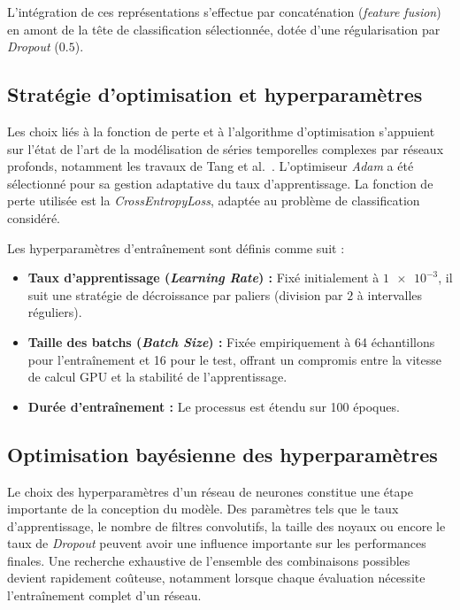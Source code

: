 \documentclass[12pt,a4paper,twoside]{article}
\begin{document}
L'intégration de ces représentations s'effectue par concaténation (\textit{feature fusion}) en amont de la tête de classification sélectionnée, dotée d'une régularisation par \textit{Dropout} ($0.5$).

\subsection{Stratégie d'optimisation et hyperparamètres}
\label{subsec:optimisation_hyper}

Les choix liés à la fonction de perte et à l'algorithme d'optimisation s'appuient sur l'état de l'art de la modélisation de séries temporelles complexes par réseaux profonds, notamment les travaux de Tang et al.~\cite{Tang2022}. L'optimiseur \textit{Adam} a été sélectionné pour sa gestion adaptative du taux d'apprentissage. La fonction de perte utilisée est la \textit{CrossEntropyLoss}, adaptée au problème de classification considéré.

Les hyperparamètres d'entraînement sont définis comme suit :
\begin{itemize}
    \item \textbf{Taux d'apprentissage (\textit{Learning Rate}) :} Fixé initialement à $\num{1e-3}$, il suit une stratégie de décroissance par paliers (division par $2$ à intervalles réguliers).
    
    \item \textbf{Taille des batchs (\textit{Batch Size}) :} Fixée empiriquement à \num{64} échantillons pour l'entraînement et \num{16} pour le test, offrant un compromis entre la vitesse de calcul GPU et la stabilité de l'apprentissage.
    
    \item \textbf{Durée d'entraînement :} Le processus est étendu sur \num{100} époques.
\end{itemize}

\subsection{Optimisation bayésienne des hyperparamètres}
\label{subsec:optimisation_bayesienne}

Le choix des hyperparamètres d'un réseau de neurones constitue une étape importante de la conception du modèle. Des paramètres tels que le taux d'apprentissage, le nombre de filtres convolutifs, la taille des noyaux ou encore le taux de \textit{Dropout} peuvent avoir une influence importante sur les performances finales. Une recherche exhaustive de l'ensemble des combinaisons possibles devient rapidement coûteuse, notamment lorsque chaque évaluation nécessite l'entraînement complet d'un réseau.
\end{document}
